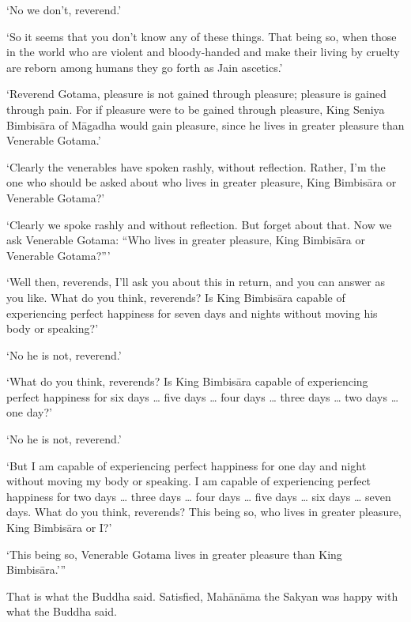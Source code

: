 \documentclass[12pt,openany]{book}%
\begin{document}
‘No we don’t, reverend.’ 

‘So it seems that you don’t know any of these things. That being so, when those in the world who are violent and bloody-handed and make their living by cruelty are reborn among humans they go forth as Jain ascetics.’ 

‘Reverend Gotama, pleasure is not gained through pleasure; pleasure is gained through pain. For if pleasure were to be gained through pleasure, King Seniya \textsanskrit{Bimbisāra} of \textsanskrit{Māgadha} would gain pleasure, since he lives in greater pleasure than Venerable Gotama.’ 

‘Clearly the venerables have spoken rashly, without reflection. Rather, I’m the one who should be asked about who lives in greater pleasure, King \textsanskrit{Bimbisāra} or Venerable Gotama?’ 

‘Clearly we spoke rashly and without reflection. But forget about that. Now we ask Venerable Gotama: “Who lives in greater pleasure, King \textsanskrit{Bimbisāra} or Venerable Gotama?”' 

‘Well then, reverends, I’ll ask you about this in return, and you can answer as you like. What do you think, reverends? Is King \textsanskrit{Bimbisāra} capable of experiencing perfect happiness for seven days and nights without moving his body or speaking?’ 

‘No he is not, reverend.’ 

‘What do you think, reverends? Is King \textsanskrit{Bimbisāra} capable of experiencing perfect happiness for six days … five days … four days … three days … two days … one day?’ 

‘No he is not, reverend.’ 

‘But I am capable of experiencing perfect happiness for one day and night without moving my body or speaking. I am capable of experiencing perfect happiness for two days … three days … four days … five days … six days … seven days. What do you think, reverends? This being so, who lives in greater pleasure, King \textsanskrit{Bimbisāra} or I?’ 

‘This being so, Venerable Gotama lives in greater pleasure than King \textsanskrit{Bimbisāra}.’” 

That is what the Buddha said. Satisfied, \textsanskrit{Mahānāma} the Sakyan was happy with what the Buddha said. 
\end{document}
